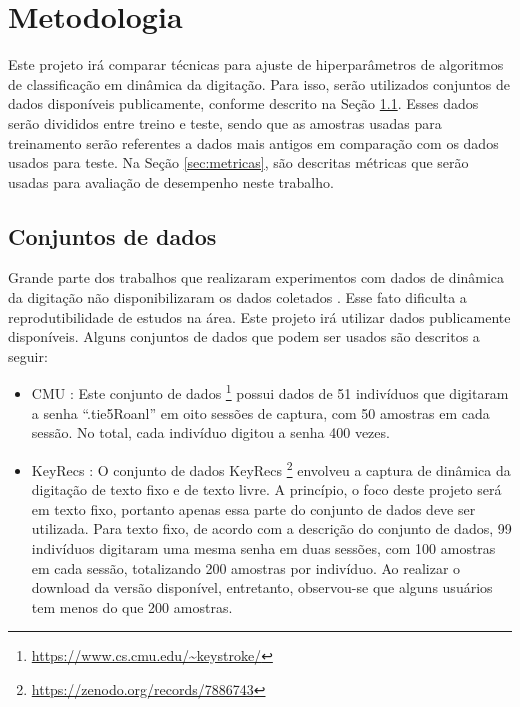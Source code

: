 
\section{Metodologia}
\label{sec:metodologia}

Este projeto irá comparar técnicas para ajuste de hiperparâmetros de algoritmos de classificação em dinâmica da digitação. Para isso, serão utilizados conjuntos de dados disponíveis publicamente, conforme descrito na Seção \ref{sec:datasets}. Esses dados serão divididos entre treino e teste, sendo que as amostras usadas para treinamento serão referentes a dados mais antigos em comparação com os dados usados para teste. Na Seção \ref{sec:metricas}, são descritas métricas que serão usadas para avaliação de desempenho neste trabalho.


\subsection{Conjuntos de dados}
\label{sec:datasets}

Grande parte dos trabalhos que realizaram experimentos com dados de dinâmica da digitação não disponibilizaram os dados coletados \cite{Roy2022systematic}. Esse fato dificulta a reprodutibilidade de estudos na área. Este projeto irá utilizar dados publicamente disponíveis. Alguns conjuntos de dados que podem ser usados são descritos a seguir:

\begin{itemize}
    \item CMU \cite{Killourhy2009}: Este conjunto de dados \footnote{\url{https://www.cs.cmu.edu/~keystroke/}} possui dados de 51 indivíduos que digitaram a senha ``.tie5Roanl'' em oito sessões de captura, com 50 amostras em cada sessão. No total, cada indivíduo digitou a senha 400 vezes.
    \item KeyRecs \cite{Dias2023keyrecs}: O conjunto de dados KeyRecs \footnote{\url{https://zenodo.org/records/7886743}} envolveu a captura de dinâmica da digitação de texto fixo e de texto livre. A princípio, o foco deste projeto será em texto fixo, portanto apenas essa parte do conjunto de dados deve ser utilizada. Para texto fixo, de acordo com a descrição do conjunto de dados, 99 indivíduos digitaram uma mesma senha em duas sessões, com 100 amostras em cada sessão, totalizando 200 amostras por indivíduo. Ao realizar o download da versão disponível, entretanto, observou-se que alguns usuários tem menos do que 200 amostras.
\end{itemize}


